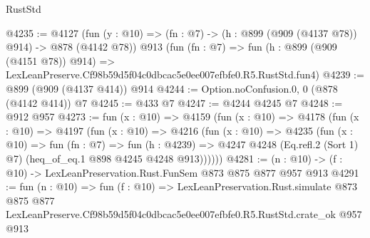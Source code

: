 \begin{lexlean}{RustStd}
\begin{coremodule}
@4235 := @4127
    (fun (y : @10) => (fn : @7) -> (h : @899 (@909 (@4137 @78)) @914) -> @878 (@4142 @78))
    @913
    (fun (fn : @7) =>
    fun (h : @899 (@909 (@4151 @78)) @914) =>
    LexLeanPreserve.Cf98b59d5f04c0dbcac5e0ee007efbfe0.R5.RustStd.fun4)
@4239 := @899 (@909 (@4137 @414)) @914
@4244 := Option.noConfusion.{0, 0} (@878 (@4142 @414)) @7
@4245 := @433 @7
@4247 := @4244 @4245 @7
@4248 := @912 @957
@4273 := fun (x : @10) =>
  @4159
    (fun (x : @10) =>
    @4178
      (fun (x : @10) =>
      @4197
        (fun (x : @10) =>
        @4216
          (fun (x : @10) =>
          @4235
            (fun (x : @10) =>
            fun (fn : @7) =>
            fun (h : @4239) =>
            @4247 @4248 (Eq.refl.{2} (Sort 1) @7) (heq_of_eq.{1} @898 @4245 @4248 @913))))))
@4281 := (n : @10) -> (f : @10) -> LexLeanPreservation.Rust.FunSem @873 @875 @877 @957 @913
@4291 := fun (n : @10) =>
  fun (f : @10) =>
  LexLeanPreservation.Rust.simulate
    @873
    @875
    @877
    LexLeanPreserve.Cf98b59d5f04c0dbcac5e0ee007efbfe0.R5.RustStd.crate_ok
    @957
    @913
\end{coremodule}
\end{lexlean}
